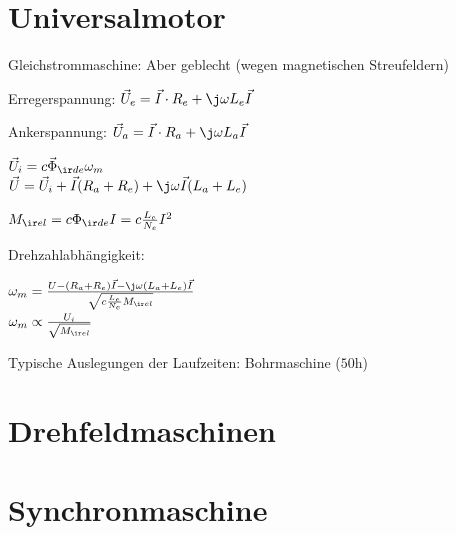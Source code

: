 \documentclass[fs, german]{latex4ei_fs}
\begin{document}
\section{Universalmotor}
Gleichstrommaschine: Aber geblecht (wegen magnetischen Streufeldern)


Erregerspannung: $\vec U_e = \vec I \cdot R_e + \j \omega L_e \vec I$

Ankerspannung: $\vec U_a = \vec I \cdot R_a + \j \omega L_a \vec I$

$\vec U_i = c \vec \Phi_{\ir de} \omega_m$ \\


$\vec U = \vec U_i + \vec I (R_a + R_e) + \j \omega \vec I (L_a + L_e)$

$M_{\ir el} = c \Phi_{\ir de} I = c \frac{L_e}{N_e} I^2$

Drehzahlabhängigkeit:

$\omega_m = \frac{U- (R_a + R_e) \vec I - \j \omega (L_a + L_e) \vec I}{\sqrt{c \frac{L_e}{N_e}M_{\ir el}}}$ \\
$\omega_m \propto \frac{U_i}{\sqrt{M_{\ir el}}}$

Typische Auslegungen der Laufzeiten: Bohrmaschine ($50 \si{\hour}$)

\section{Drehfeldmaschinen}


\section{Synchronmaschine}
\end{document}
